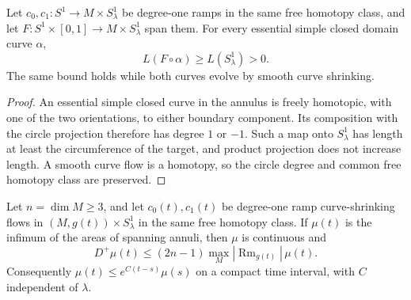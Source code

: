 \begin{lemma}
\label{lem:ramp-annulus-nondegeneration}
\notready
Let $c_0,c_1\colon S^1\to M\times S^1_\lambda$ be degree-one ramps in the
same free homotopy class, and let
$F\colon S^1\times[0,1]\to M\times S^1_\lambda$ span them.  For every
essential simple closed domain curve $\alpha$,
\[
 L(F\circ\alpha)\ge L(S^1_\lambda)>0.
\]
The same bound holds while both curves evolve by smooth curve shrinking.
\end{lemma}

\begin{proof}
An essential simple closed curve in the annulus is freely homotopic, with one
of the two orientations, to either boundary component.  Its composition with
the circle projection therefore has degree $1$ or $-1$.  Such a map onto
$S^1_\lambda$ has length at least the circumference of the target, and product
projection does not increase length.  A smooth curve flow is a homotopy, so
the circle degree and common free homotopy class are preserved.
\end{proof}

\begin{lemma}
\label{lem:annular-area-infimum-variation}
\notready
Let $n=\dim M\ge3$, and let $c_0(t),c_1(t)$ be degree-one ramp
curve-shrinking flows in $(M,g(t))\times S^1_\lambda$ in the same free
homotopy class.  If $\mu(t)$ is the infimum of the areas of spanning annuli,
then $\mu$ is continuous and
\[
 D^+\mu(t)\le(2n-1)\max_M|\operatorname{Rm}_{g(t)}|\,\mu(t).
\]
Consequently $\mu(t)\le e^{C(t-s)}\mu(s)$ on a compact time interval, with
$C$ independent of $\lambda$.
\end{lemma}

